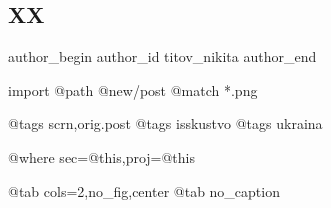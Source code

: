  
 
 
 
 
 
\subsection{XX}
\label{sec:18_11_2022.fb.titov_nikita.1.xx}
 
\ifcmt
 author_begin
   author_id titov_nikita
 author_end
\fi

\ifcmt
  import
    @path @new/post
    @match *.png
  
    @tags scrn,orig.post
    @tags isskustvo
    @tags ukraina

    @where sec=@this,proj=@this
  
    @tab cols=2,no_fig,center
    @tab no_caption
\fi
